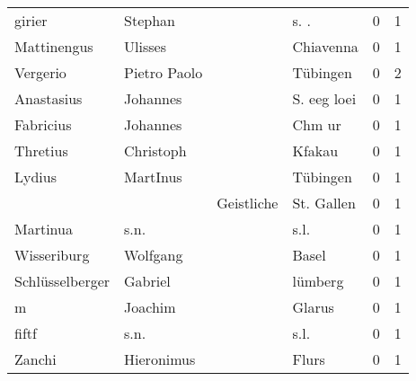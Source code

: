 \begin{tabular}{llllrr}
                   girier &                            Stephan &             &                                       s. .  &          0 &         1 \\
              Mattinengus &                            Ulisses &             &                                   Chiavenna &          0 &         1 \\
                 Vergerio &                       Pietro Paolo &             &                                    Tübingen &          0 &         2 \\
               Anastasius &                           Johannes &             &                                 S. eeg loei &          0 &         1 \\
                Fabricius &                           Johannes &             &                                      Chm ur &          0 &         1 \\
                 Thretius &                          Christoph &             &                                      Kfakau &          0 &         1 \\
                   Lydius &                           MartInus &             &                                    Tübingen &          0 &         1 \\
                          &                                    &  Geistliche &                                  St. Gallen &          0 &         1 \\
                 Martinua &                               s.n. &             &                                        s.l. &          0 &         1 \\
              Wisseriburg &                           Wolfgang &             &                                       Basel &          0 &         1 \\
          Schlüsselberger &                            Gabriel &             &                                     lümberg &          0 &         1 \\
                        m &                            Joachim &             &                                      Glarus &          0 &         1 \\
                    fiftf &                               s.n. &             &                                        s.l. &          0 &         1 \\
                   Zanchi &                         Hieronimus &             &                                       Flurs &          0 &         1 \\

\end{tabular}
